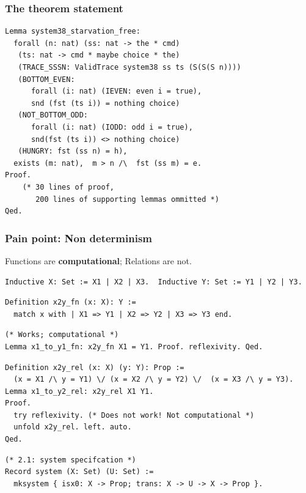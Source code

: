 \documentclass{beamer}
\begin{document}
\begin{frame}[fragile]
\frametitle{The theorem statement}
\begin{verbatim}
Lemma system38_starvation_free:
  forall (n: nat) (ss: nat -> the * cmd)
   (ts: nat -> cmd * maybe choice * the)
   (TRACE_SSSN: ValidTrace system38 ss ts (S(S(S n))))
   (BOTTOM_EVEN: 
      forall (i: nat) (IEVEN: even i = true), 
      snd (fst (ts i)) = nothing choice)
   (NOT_BOTTOM_ODD: 
      forall (i: nat) (IODD: odd i = true),
      snd(fst (ts i)) <> nothing choice)
   (HUNGRY: fst (ss n) = h),
  exists (m: nat),  m > n /\  fst (ss m) = e.
Proof.
    (* 30 lines of proof, 
       200 lines of supporting lemmas ommitted *)
Qed.
\end{verbatim}
\end{frame}


\begin{frame}[fragile]
\frametitle{Pain point: Non determinism}
Functions are \textbf{computational}; Relations are not.
\pause
{\footnotesize
\begin{verbatim}
Inductive X: Set := X1 | X2 | X3.  Inductive Y: Set := Y1 | Y2 | Y3. 
\end{verbatim}
\pause
\begin{verbatim}
Definition x2y_fn (x: X): Y :=
  match x with | X1 => Y1 | X2 => Y2 | X3 => Y3 end.
\end{verbatim}
\pause
\begin{verbatim}
(* Works; computational *)
Lemma x1_to_y1_fn: x2y_fn X1 = Y1. Proof. reflexivity. Qed.
\end{verbatim}
\pause



\begin{verbatim}
Definition x2y_rel (x: X) (y: Y): Prop :=
  (x = X1 /\ y = Y1) \/ (x = X2 /\ y = Y2) \/  (x = X3 /\ y = Y3).
Lemma x1_to_y2_rel: x2y_rel X1 Y1.
Proof.
  try reflexivity. (* Does not work! Not computational *)
  unfold x2y_rel. left. auto.
Qed.
\end{verbatim}
\pause
\begin{verbatim}
(* 2.1: system specifcation *)
Record system (X: Set) (U: Set) := 
  mksystem { isx0: X -> Prop; trans: X -> U -> X -> Prop }.
\end{verbatim}
}
\end{frame}
\end{document}

